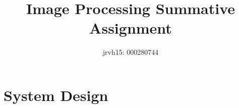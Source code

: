 \documentclass[]{article}
\title{Image Processing Summative Assignment}
\author{jrvh15: 000280744}
\begin{document}
\maketitle

\section{System Design}
\end{document}
